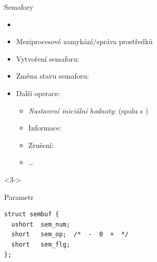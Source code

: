 \begin{frame}[fragile]{Semafory}

  \begin{itemize}
    \item {}
    \item<+-> Meziprocesové zamykání/správa prostředků
    \item<+-> Vytvoření semaforu: 
    \item<+-> Změna stavu semaforu: 
    \item<+-> Další operace: 
    \begin{itemize}
      \item \emph{Nastavení iniciální hodnoty}:  (spolu s
	)
      \item Informace: 
      \item Zrušení: 
      \item \dots
    \end{itemize}
  \end{itemize}

  \begin{uncoverenv}<3->
  \begin{block}{Parametr }
  \begin{lstlisting}
struct sembuf {
  ushort  sem_num;
  short   sem_op;  /*  -  0  +  */
  short   sem_flg;
};
  \end{lstlisting}
  \end{block}
  \end{uncoverenv}

\end{frame}

